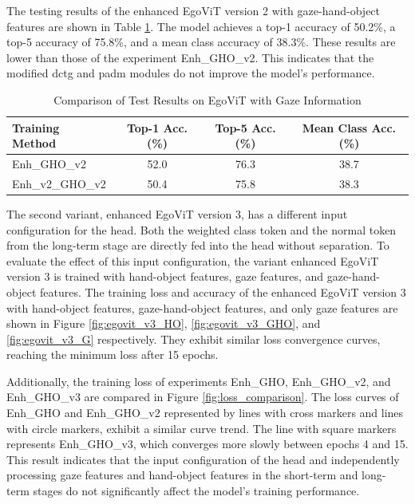 The testing results of the enhanced EgoViT version 2 with gaze-hand-object features are shown in Table \ref{tab:Results_table4}. The model achieves a top-1 accuracy of 50.2\%, a top-5 accuracy of 75.8\%, and a mean class accuracy of 38.3\%. These results are lower than those of the experiment Enh\_GHO\_v2. This indicates that the modified \gls{dctg} and \gls{padm} modules do not improve the model's performance. 
\vspace{5mm}
\begin{table}[htbp]
    \centering
    \caption{Comparison of Test Results on EgoViT with Gaze Information}
    \begin{tabular}{lccc}
    \hline\hline
    Training Method & Top-1 Acc.(\%)& Top-5 Acc.(\%)& Mean Class Acc.(\%) \\
    \hline
    Enh\_GHO\_v2 & 52.0 & 76.3 & 38.7 \\
    Enh\_v2\_GHO\_v2 & 50.4 & 75.8 & 38.3 \\
    \hline\hline
    \end{tabular}
    \label{tab:Results_table4}
\end{table}
\clearpage
The second variant, enhanced EgoViT version 3, has a different input configuration for the head. Both the weighted class token and the normal token from the long-term stage are directly fed into the head without separation. To evaluate the effect of this input configuration, the variant enhanced EgoViT version 3 is trained with hand-object features, gaze features, and gaze-hand-object features. The training loss and accuracy of the enhanced EgoViT version 3 with hand-object features, gaze-hand-object features, and only gaze features are shown in Figure \ref{fig:egovit_v3_HO}, \ref{fig:egovit_v3_GHO}, and \ref{fig:egovit_v3_G} respectively. They exhibit similar loss convergence curves, reaching the minimum loss after 15 epochs. 

Additionally, the training loss of experiments Enh\_GHO,  Enh\_GHO\_v2, and \\ Enh\_GHO\_v3 are compared in Figure \ref{fig:loss_comparison}. The loss curves of Enh\_GHO and Enh\_GHO\_v2 represented by lines with cross markers and lines with circle markers, exhibit a similar curve trend. The line with square markers represents Enh\_GHO\_v3, which converges more slowly between epochs 4 and 15. This result indicates that the input configuration of the head and independently processing gaze features and hand-object features in the short-term and long-term stages do not significantly affect the model's training performance.

